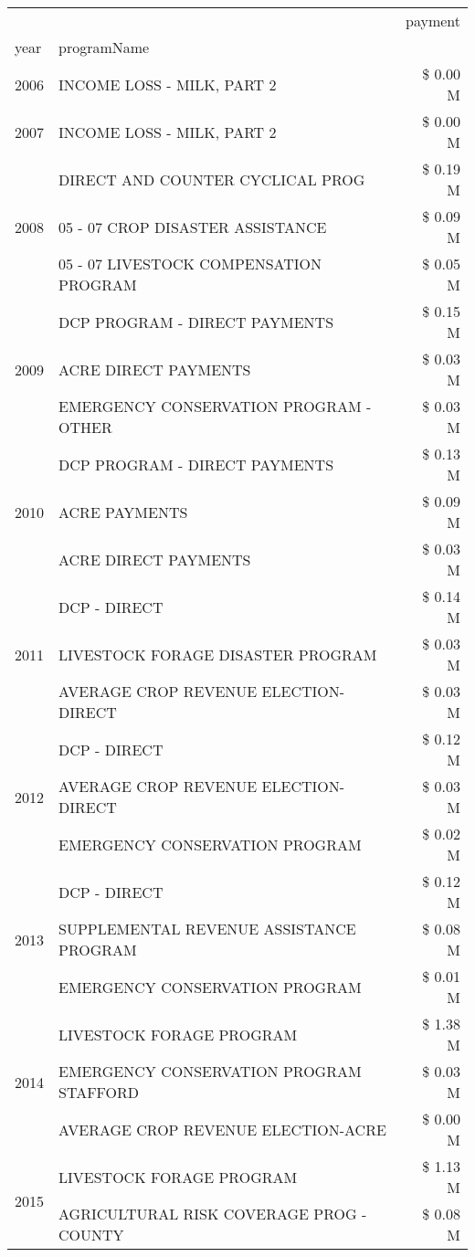 \begin{tabular}{llr}
\toprule
 &  & payment \\
year & programName &  \\
\midrule
2006 & INCOME LOSS - MILK, PART 2 & \$ 0.00 M \\
\cline{1-3}
2007 & INCOME LOSS - MILK, PART 2 & \$ 0.00 M \\
\cline{1-3}
\multirow[t]{3}{*}{2008} & DIRECT AND COUNTER CYCLICAL PROG & \$ 0.19 M \\
 & 05 - 07 CROP DISASTER ASSISTANCE & \$ 0.09 M \\
 & 05 - 07 LIVESTOCK COMPENSATION PROGRAM & \$ 0.05 M \\
\cline{1-3}
\multirow[t]{3}{*}{2009} & DCP PROGRAM - DIRECT PAYMENTS & \$ 0.15 M \\
 & ACRE DIRECT PAYMENTS & \$ 0.03 M \\
 & EMERGENCY CONSERVATION PROGRAM - OTHER & \$ 0.03 M \\
\cline{1-3}
\multirow[t]{3}{*}{2010} & DCP PROGRAM - DIRECT PAYMENTS & \$ 0.13 M \\
 & ACRE PAYMENTS & \$ 0.09 M \\
 & ACRE DIRECT PAYMENTS & \$ 0.03 M \\
\cline{1-3}
\multirow[t]{3}{*}{2011} & DCP - DIRECT & \$ 0.14 M \\
 & LIVESTOCK FORAGE DISASTER PROGRAM & \$ 0.03 M \\
 & AVERAGE CROP REVENUE ELECTION-DIRECT & \$ 0.03 M \\
\cline{1-3}
\multirow[t]{3}{*}{2012} & DCP - DIRECT & \$ 0.12 M \\
 & AVERAGE CROP REVENUE ELECTION-DIRECT & \$ 0.03 M \\
 & EMERGENCY CONSERVATION PROGRAM & \$ 0.02 M \\
\cline{1-3}
\multirow[t]{3}{*}{2013} & DCP - DIRECT & \$ 0.12 M \\
 & SUPPLEMENTAL REVENUE ASSISTANCE PROGRAM & \$ 0.08 M \\
 & EMERGENCY CONSERVATION PROGRAM & \$ 0.01 M \\
\cline{1-3}
\multirow[t]{3}{*}{2014} & LIVESTOCK FORAGE PROGRAM & \$ 1.38 M \\
 & EMERGENCY CONSERVATION PROGRAM STAFFORD & \$ 0.03 M \\
 & AVERAGE CROP REVENUE ELECTION-ACRE & \$ 0.00 M \\
\cline{1-3}
\multirow[t]{3}{*}{2015} & LIVESTOCK FORAGE PROGRAM & \$ 1.13 M \\
 & AGRICULTURAL RISK COVERAGE PROG - COUNTY & \$ 0.08 M \\

\end{tabular}
